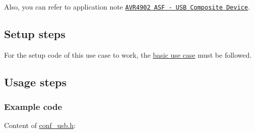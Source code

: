 Also, you can refer to application note \href{http://www.atmel.com/dyn/resources/prod_documents/doc8445.pdf}{\tt A\-V\-R4902 A\-S\-F -\/ U\-S\-B Composite Device}.\hypertarget{udi_cdc_use_case_composite_udi_cdc_use_case_composite_setup}{}\subsection{Setup steps}\label{udi_cdc_use_case_composite_udi_cdc_use_case_composite_setup}
For the setup code of this use case to work, the \hyperlink{udi_cdc_quickstart_udi_cdc_basic_use_case}{basic use case} must be followed.\hypertarget{udi_cdc_use_case_composite_udi_cdc_use_case_composite_usage}{}\subsection{Usage steps}\label{udi_cdc_use_case_composite_udi_cdc_use_case_composite_usage}
\hypertarget{udi_cdc_use_case_composite_udi_cdc_use_case_composite_usage_code}{}\subsubsection{Example code}\label{udi_cdc_use_case_composite_udi_cdc_use_case_composite_usage_code}
Content of \hyperlink{conf__usb_8h}{conf\-\_\-usb.\-h}\-: 
